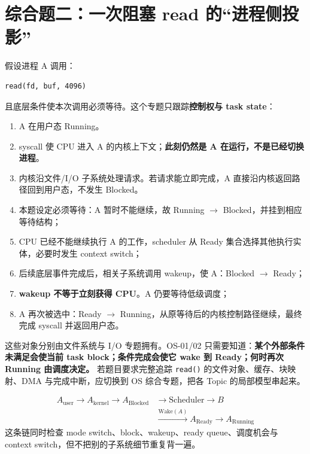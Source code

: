 \documentclass[11pt,a4paper]{ctexart}
\newcommand{\kw}[1]{\textbf{#1}}
\newcommand{\code}[1]{\texttt{#1}}
\begin{document}
\section{综合题二：一次阻塞 read 的“进程侧投影”}

假设进程 A 调用：
\begin{verbatim}
read(fd, buf, 4096)
\end{verbatim}
且底层条件使本次调用必须等待。这个专题只跟踪\kw{控制权与 task state}：

\begin{enumerate}
\item A 在用户态 Running。
\item syscall 使 CPU 进入 A 的内核上下文；\kw{此刻仍然是 A 在运行，不是已经切换进程}。
\item 内核沿文件/I/O 子系统处理请求。若请求能立即完成，A 直接沿内核返回路径回到用户态，不发生 Blocked。
\item 本题设定必须等待：A 暂时不能继续，故 Running $\to$ Blocked，并挂到相应等待结构；
\item CPU 已经不能继续执行 A 的工作，scheduler 从 Ready 集合选择其他执行实体，必要时发生 context switch；
\item 后续底层事件完成后，相关子系统调用 wakeup，使 A：Blocked $\to$ Ready；
\item \kw{wakeup 不等于立刻获得 CPU}。A 仍要等待低级调度；
\item A 再次被选中：Ready $\to$ Running，从原等待后的内核控制路径继续，最终完成 syscall 并返回用户态。
\end{enumerate}

\begin{method}
这些对象分别由文件系统与 I/O 专题拥有。OS-01/02 只需要知道：\kw{某个外部条件未满足会使当前 task block；条件完成会使它 wake 到 Ready；何时再次 Running 由调度决定。} 若题目要求完整追踪 \code{read()} 的文件对象、缓存、块映射、DMA 与完成中断，应切换到 OS 综合专题，把各 Topic 的局部模型串起来。
\end{method}

\begin{exam}[本专题真正要拿下的链]
\[
\boxed{
\begin{aligned}
A_{\text{user}} \rightarrow A_{\text{kernel}} \rightarrow A_{\text{Blocked}} &\rightarrow \text{Scheduler} \rightarrow B\\
&\xrightarrow{\text{Wake}(A)} A_{\text{Ready}} \rightarrow A_{\text{Running}}
\end{aligned}
}
\]
这条链同时检查 mode switch、block、wakeup、ready queue、调度机会与 context switch，但不把别的子系统细节重复背一遍。
\end{exam}
\end{document}
